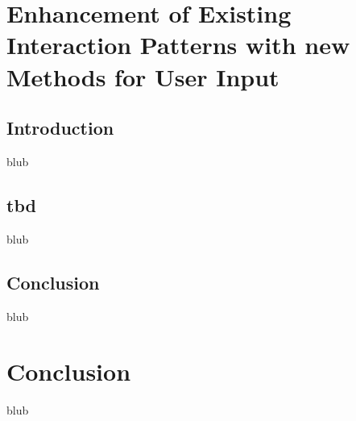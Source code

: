 
\section{Enhancement of Existing Interaction Patterns with new Methods for User Input}

\label{SectionLiteratureReviewSRQ3}


\subsection{Introduction}

blub



\subsection{tbd}

blub


\subsection{Conclusion}

blub





\section{Conclusion}

\label{SectionLiteratureReviewConclusion}

blub

